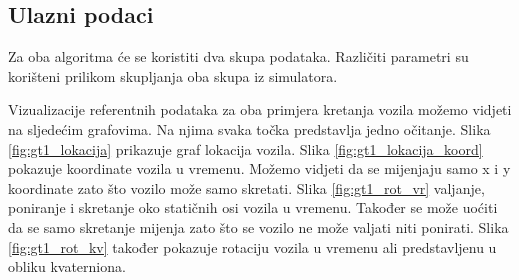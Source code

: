 \subsection{Ulazni podaci}

Za oba algoritma će se koristiti dva skupa podataka. Različiti parametri su korišteni prilikom skupljanja oba skupa iz simulatora.

Vizualizacije referentnih podataka za oba primjera kretanja vozila možemo vidjeti na sljedećim grafovima. Na njima svaka točka predstavlja jedno očitanje. Slika \ref{fig:gt1_lokacija} prikazuje graf lokacija vozila. Slika \ref{fig:gt1_lokacija_koord} pokazuje koordinate vozila u vremenu. Možemo vidjeti da se mijenjaju samo x i y koordinate zato što vozilo može samo skretati. Slika \ref{fig:gt1_rot_vr} valjanje, poniranje i skretanje oko statičnih osi vozila u vremenu. Također se može uoćiti da se samo skretanje mijenja zato što se vozilo ne može valjati niti ponirati. Slika \ref{fig:gt1_rot_kv} također pokazuje rotaciju vozila u vremenu ali predstavljenu u obliku kvaterniona. 

